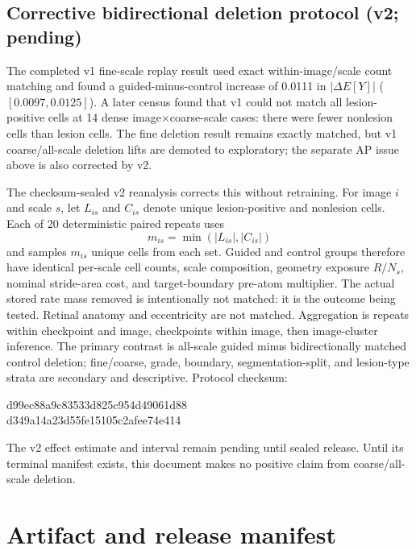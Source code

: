 \documentclass[10pt,twocolumn,letterpaper]{article}
\begin{document}
\subsection{Corrective bidirectional deletion protocol (v2; pending)}

The completed v1 fine-scale replay result used exact within-image/scale count
matching and found a guided-minus-control increase of 0.0111 in
$|\Delta E[Y]|$ ($[0.0097,0.0125]$).  A later census found that v1 could not
match all lesion-positive cells at 14 dense image$\times$coarse-scale cases:
there were fewer nonlesion cells than lesion cells.  The fine deletion result
remains exactly matched, but v1 coarse/all-scale deletion lifts are demoted to
exploratory; the separate AP issue above is also corrected by v2.

The checksum-sealed v2 reanalysis corrects this without retraining.  For image
$i$ and scale $s$, let $L_{is}$ and $C_{is}$ denote unique lesion-positive and
nonlesion cells.  Each of 20 deterministic paired repeats uses
\begin{equation}
 m_{is}=\min(|L_{is}|,|C_{is}|)
 \label{eq:idrid-m}
\end{equation}
and samples $m_{is}$ unique cells from each set.  Guided and control groups
therefore have identical per-scale cell counts, scale composition, geometry
exposure $R/N_s$, nominal stride-area cost, and target-boundary pre-atom
multiplier.  The actual stored rate mass removed is intentionally not matched:
it is the outcome being tested.  Retinal anatomy and eccentricity are not
matched.  Aggregation is repeats within checkpoint and image, checkpoints
within image, then image-cluster inference.  The primary
contrast is all-scale guided minus bidirectionally matched control deletion;
fine/coarse, grade, boundary, segmentation-split, and lesion-type strata are
secondary and descriptive.  Protocol checksum:
\begin{center}
\scriptsize\ttfamily
d99ec88a9c83533d825c954d49061d88\\
d349a14a23d55fe15105c2afee74e414
\end{center}

The v2 effect estimate and interval remain pending until sealed release.  Until its terminal manifest
exists, this document makes no positive claim from coarse/all-scale deletion.

\section{Artifact and release manifest}
\label{sec:artifacts}
\end{document}
